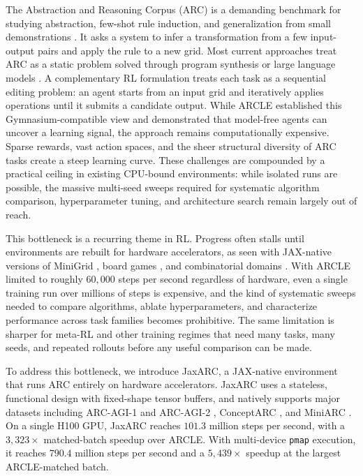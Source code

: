 The Abstraction and Reasoning Corpus (ARC) is a demanding benchmark for studying abstraction, few-shot rule induction, and generalization from small demonstrations \citep{cholletMeasureIntelligence2019}. It asks a system to infer a transformation from a few input-output pairs and apply the rule to a new grid. Most current approaches treat ARC as a static problem solved through program synthesis \citep{alfordNeuralGuidedBidirectionalProgram2022} or large language models \citep{buttCodeItSelfimprovingLanguage2024,batorskiNSANeurosymbolicARC2025}. A complementary RL formulation treats each task as a sequential editing problem: an agent starts from an input grid and iteratively applies operations until it submits a candidate output. While ARCLE \citep{leeARCLEAbstractionReasoning2025} established this Gymnasium-compatible view and demonstrated that model-free agents can uncover a learning signal, the approach remains computationally expensive. Sparse rewards, vast action spaces, and the sheer structural diversity of ARC tasks create a steep learning curve. These challenges are compounded by a practical ceiling in existing CPU-bound environments: while isolated runs are possible, the massive multi-seed sweeps required for systematic algorithm comparison, hyperparameter tuning, and architecture search remain largely out of reach.

This bottleneck is a recurring theme in RL. Progress often stalls until environments are rebuilt for hardware accelerators, as seen with JAX-native versions of MiniGrid \citep{pignatelliNAVIXScalingMiniGrid2025}, board games \citep{koyamadaPgxHardwareAcceleratedParallel2023}, and combinatorial domains \citep{bonnetJumanjiDiverseSuite2023}. With ARCLE limited to roughly $60,000$ steps per second regardless of hardware, even a single training run over millions of steps is expensive, and the kind of systematic sweeps needed to compare algorithms, ablate hyperparameters, and characterize performance across task families becomes prohibitive. The same limitation is sharper for meta-RL \citep{beckTutorialMetaReinforcementLearning2025} and other training regimes that need many tasks, many seeds, and repeated rollouts before any useful comparison can be made.

To address this bottleneck, we introduce JaxARC, a JAX-native environment that runs ARC entirely on hardware accelerators. JaxARC uses a stateless, functional design with fixed-shape tensor buffers, and natively supports major datasets including ARC-AGI-1 and ARC-AGI-2 \citep{cholletMeasureIntelligence2019,cholletARCAGI2NewChallenge2025}, ConceptARC \citep{moskvichevConceptARCBenchmarkEvaluating2023}, and MiniARC \citep{kimPlaygroundsAbstractionReasoning2022}. On a single H100 GPU, JaxARC reaches $101.3$ million steps per second, with a $3,323\times$ matched-batch speedup over ARCLE. With multi-device \texttt{pmap} execution, it reaches $790.4$ million steps per second and a $5,439\times$ speedup at the largest ARCLE-matched batch.

